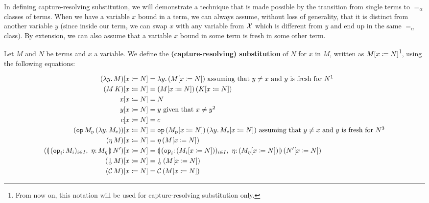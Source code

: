 In defining capture-resolving substitution, we will demonstrate a technique
that is made possible by the transition from single terms to $=_\alpha$
classes of terms. When we have a variable $x$ bound in a term, we can
always assume, without loss of generality, that it is distinct from another
variable $y$ (since inside our term, we can swap $x$ with any variable from
$\mathcal{X}$ which is different from $y$ and end up in the same $=_\alpha$
class). By extension, we can also assume that a variable $x$ bound in some
term is fresh in some other term.

\begin{definition}\label{def:capture-resolving-substitution}
  Let $M$ and $N$ be terms and $x$ a variable. We define the
  \textbf{(capture-resolving) substitution} of $N$ for $x$ in $M$, written as
  $M[x \coloneqq N]$\footnote{From now on, this notation will be used for
    capture-resolving substitution only.}, using the following equations:

  \begin{align*}
    \subst{(\lam{y}{M})}{x}{N} &= \lam{y}{(\subst{M}{x}{N})} \textrm{ assuming
      that } y \neq x \textrm{ and $y$ is fresh for $N$} \footnotemark \\
    \subst{(\ap{M}{K})}{x}{N} &= \ap{(\subst{M}{x}{N})}{(\subst{K}{x}{N})} \\
    \subst{x}{x}{N} &= N \\
    \subst{y}{x}{N} &= y \textrm{ given that } x \neq y \footnotemark \\
    \subst{c}{x}{N} &= c \\
    \subst{(\app{\op{op}}{M_\petitp}{(\lam{y}{M_\petitc})})}{x}{N}
    &= \app{\op{op}}{(\subst{M_\petitp}{x}{N})}{(\lam{y}{\subst{M_\petitc}{x}{N}})}
    \textrm{ assuming that } y \neq x \textrm{ and $y$ is fresh for $N$} \footnotemark \\
    \subst{(\ap{\eta}{M})}{x}{N} &= \ap{\eta}{(\subst{M}{x}{N})} \\
    \subst{(\ap{\cibanana}{N'})}{x}{N} &= \ap{\banana{(\onto{\op{op}_i}
      (\subst{M_i}{x}{N}))_{i \in I},\ \onto{\eta} (\subst{M_\eta}{x}{N})}}
      {(\subst{N'}{x}{N})} \\
    \subst{(\ap{\cherry}{M})}{x}{N} &= \ap{\cherry}{(\subst{M}{x}{N})} \\
    \subst{(\ap{\CC}{M})}{x}{N} &= \ap{\CC}{(\subst{M}{x}{N})}
  \end{align*}
\end{definition}

\addtocounter{footnote}{-1}

